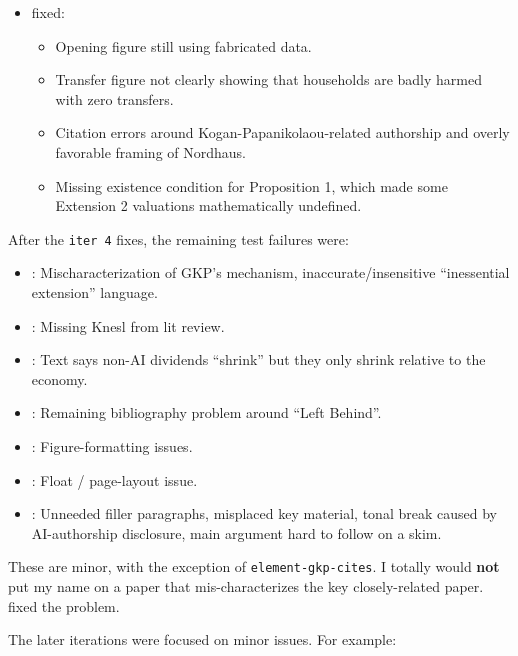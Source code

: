 \begin{itemize}
\item {} fixed:
\begin{itemize}
\item Opening figure still using fabricated data.
\item Transfer figure not clearly showing that households are badly harmed with zero transfers.
\item Citation errors around Kogan-Papanikolaou-related authorship and overly favorable framing of Nordhaus.
\item Missing existence condition for Proposition 1, which made some Extension 2 valuations mathematically undefined.
\end{itemize}
\end{itemize}

After the \texttt{iter 4} fixes, the remaining test failures were:

\begin{itemize}
\item {}: Mischaracterization of GKP's mechanism, inaccurate/insensitive ``inessential extension'' language.
\item {}: Missing Knesl from lit review.
\item {}: Text says non-AI dividends ``shrink'' but they only shrink relative to the economy.
\item {}: Remaining bibliography problem around ``Left Behind''.
\item {}: Figure-formatting issues.
\item {}: Float / page-layout issue.
\item {}: Unneeded filler paragraphs, misplaced key material, tonal break caused by AI-authorship disclosure, main argument hard to follow on a skim.
\end{itemize}

These are minor, with the exception of \texttt{element-gkp-cites}. I totally would \textbf{not} put my name on a paper that mis-characterizes the key closely-related paper.  fixed the problem.

The later iterations were focused on minor issues. For example:

